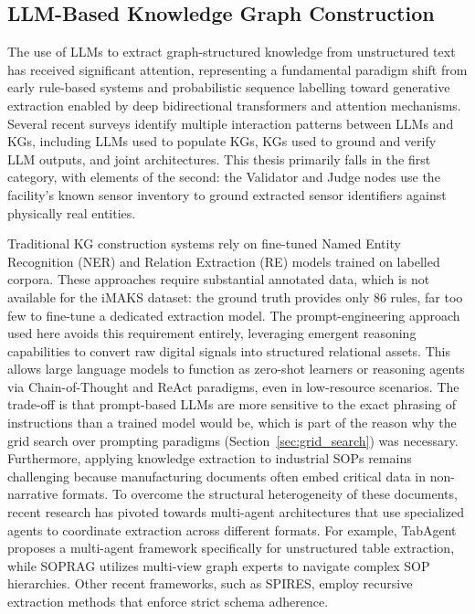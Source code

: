 ﻿\documentclass[11pt]{article}
\begin{document}
\subsection{LLM-Based Knowledge Graph Construction}
\label{sec:rw_kgllm}

The use of LLMs to extract graph-structured knowledge from unstructured text has
received significant attention, representing a fundamental paradigm shift from early rule-based systems and probabilistic sequence labelling toward generative extraction enabled by deep bidirectional transformers and attention mechanisms.
Several recent surveys identify multiple interaction patterns between LLMs and
KGs, including LLMs used to populate KGs, KGs used to ground and verify LLM
outputs, and joint architectures.
This thesis primarily falls in the first category, with elements of the second:
the Validator and Judge nodes use the facility's known sensor inventory to
ground extracted sensor identifiers against physically real entities.

Traditional KG construction systems rely on fine-tuned Named Entity Recognition
(NER) and Relation Extraction (RE) models trained on labelled corpora.
These approaches require substantial annotated data, which is not available for
the iMAKS dataset: the ground truth provides only 86 rules, far too few to
fine-tune a dedicated extraction model.
The prompt-engineering approach used here avoids this requirement entirely, leveraging emergent reasoning capabilities to convert raw digital signals into structured relational assets. This allows large language models to function as zero-shot learners or reasoning agents via Chain-of-Thought and ReAct paradigms, even in low-resource scenarios.
The trade-off is that prompt-based LLMs are more sensitive to the exact phrasing
of instructions than a trained model would be, which is part of the reason why
the grid search over prompting paradigms (Section~\ref{sec:grid_search}) was
necessary.
Furthermore, applying knowledge extraction to industrial SOPs remains challenging because manufacturing documents often embed critical data in non-narrative formats. To overcome the structural heterogeneity of these documents, recent research has pivoted towards multi-agent architectures that use specialized agents to coordinate extraction across different formats. For example, TabAgent proposes a multi-agent framework specifically for unstructured table extraction, while SOPRAG utilizes multi-view graph experts to navigate complex SOP hierarchies. Other recent frameworks, such as SPIRES, employ recursive extraction methods that enforce strict schema adherence.
\end{document}
